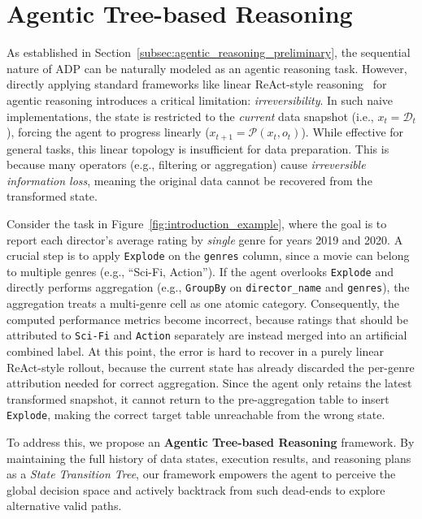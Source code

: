 \section{Agentic Tree-based Reasoning}
\label{sec:tree_based_agentic_reasoning}



As established in Section~\ref{subsec:agentic_reasoning_preliminary}, the sequential nature of ADP can be naturally modeled as an agentic reasoning task.
However, directly applying standard frameworks like linear ReAct-style reasoning~\cite{yao2023react} for agentic reasoning introduces a critical limitation: \textit{irreversibility}.
In such naive implementations, the state is restricted to the \textit{current} data snapshot (i.e., $x_t = \mathcal{D}_t$), forcing the agent to progress linearly ($x_{t+1}=\mathcal{P}(x_t, o_t)$).
While effective for general tasks, this linear topology is insufficient for data preparation. This is because many operators (e.g., filtering or aggregation) cause \textit{irreversible information loss}, meaning the original data cannot be recovered from the transformed state.

\begin{example}
%
Consider the task in Figure~\ref{fig:introduction_example}, where the goal is to report each director's average rating by \textit{single} genre for years 2019 and 2020.
A crucial step is to apply \texttt{Explode} on the \texttt{genres} column, since a movie can belong to multiple genres (e.g., ``{Sci-Fi, Action}'').
If the agent overlooks \texttt{Explode} and directly performs aggregation (e.g., \texttt{GroupBy} on \texttt{director\_name} and \texttt{genres}), the aggregation treats a multi-genre cell as one atomic category.
Consequently, the computed performance metrics become incorrect, because ratings that should be attributed to \texttt{Sci-Fi} and \texttt{Action} separately are instead merged into an artificial combined label.
At this point, the error is hard to recover in a purely linear ReAct-style rollout, because the current state has already discarded the per-genre attribution needed for correct aggregation.
Since the agent only retains the latest transformed snapshot, it cannot return to the pre-aggregation table to insert \texttt{Explode}, making the correct target table unreachable from the wrong state.
\end{example}

To address this, we propose an \textbf{Agentic Tree-based Reasoning} framework. By maintaining the full history of data states, execution results, and reasoning plans as a \textit{State Transition Tree}, our framework empowers the agent to perceive the global decision space and actively backtrack from such dead-ends to explore alternative valid paths.

